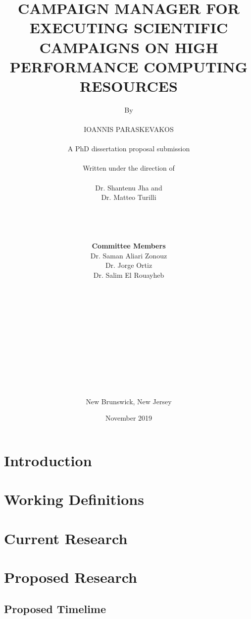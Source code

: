 

\title{CAMPAIGN MANAGER FOR EXECUTING SCIENTIFIC CAMPAIGNS ON HIGH PERFORMANCE COMPUTING RESOURCES}
\author{By\\\\IOANNIS PARASKEVAKOS\\\\A PhD dissertation proposal submission\\\\ Written under the direction of\\\\Dr. Shantenu Jha and \\Dr. Matteo Turilli\\\\\\\\\\\textbf{Committee Members}\\Dr. Saman Aliari Zonouz\\Dr. Jorge Ortiz\\Dr. Salim El Rouayheb\\\\\\\\\\\\\\\\\\\\\\\\\\New Brunswick, New Jersey}
\date{November 2019}

\maketitle
\newpage
{}



\section{Introduction}


\section{Working Definitions}


\section{Current Research}


\section{Proposed Research}

\label{sec:proposed}

\subsection{Proposed Timelime}




